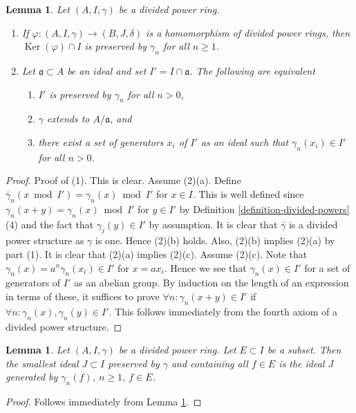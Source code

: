 \documentclass{stacks-project}
\theoremstyle{plain}
\newtheorem{lemma}[subsection]{Lemma}
\theoremstyle{definition}
\theoremstyle{remark}
\numberwithin{equation}{subsection}
\def\Ker{\mathop{\mathrm{Ker}}}
\begin{document}
\begin{lemma}
\label{lemma-kernel}
Let $(A, I, \gamma)$ be a divided power ring.
\begin{enumerate}
\item If $\varphi : (A, I, \gamma) \to (B, J, \delta)$ is a
homomorphism of divided power rings, then $\Ker(\varphi) \cap I$
is preserved by $\gamma_n$ for all $n \geq 1$.
\item Let $\mathfrak a \subset A$ be an ideal and set
$I' = I \cap \mathfrak a$. The following are equivalent
\begin{enumerate}
\item $I'$ is preserved by $\gamma_n$ for all $n > 0$,
\item $\gamma$ extends to $A/\mathfrak a$, and
\item there exist a set of generators $x_i$ of $I'$ as an ideal
such that $\gamma_n(x_i) \in I'$ for all $n > 0$.
\end{enumerate}
\end{enumerate}
\end{lemma}

\begin{proof}
Proof of (1). This is clear. Assume (2)(a). Define
$\bar\gamma_n(x \bmod I') = \gamma_n(x) \bmod I'$ for $x \in I$.
This is well defined since $\gamma_n(x + y) = \gamma_n(x) \bmod I'$
for $y \in I'$ by Definition \ref{definition-divided-powers} (4) and
the fact that $\gamma_j(y) \in I'$ by assumption. It is clear that
$\bar\gamma$ is a divided power structure as $\gamma$ is one.
Hence (2)(b) holds. Also, (2)(b) implies (2)(a) by part (1).
It is clear that (2)(a) implies (2)(c). Assume (2)(c).
Note that $\gamma_n(x) = a^n\gamma_n(x_i) \in I'$ for $x = ax_i$.
Hence we see that $\gamma_n(x) \in I'$ for a set of generators of $I'$
as an abelian group. By induction on the length of an expression in
terms of these, it suffices to prove $\forall n : \gamma_n(x + y) \in I'$
if $\forall n : \gamma_n(x), \gamma_n(y) \in I'$. This
follows immediately from the fourth axiom of a divided power structure.
\end{proof}

\begin{lemma}
\label{lemma-sub-dp-ideal}
Let $(A, I, \gamma)$ be a divided power ring.
Let $E \subset I$ be a subset.
Then the smallest ideal $J \subset I$ preserved by $\gamma$
and containing all $f \in E$ is the ideal $J$ generated by
$\gamma_n(f)$, $n \geq 1$, $f \in E$.
\end{lemma}

\begin{proof}
Follows immediately from Lemma \ref{lemma-kernel}.
\end{proof}
\end{document}
